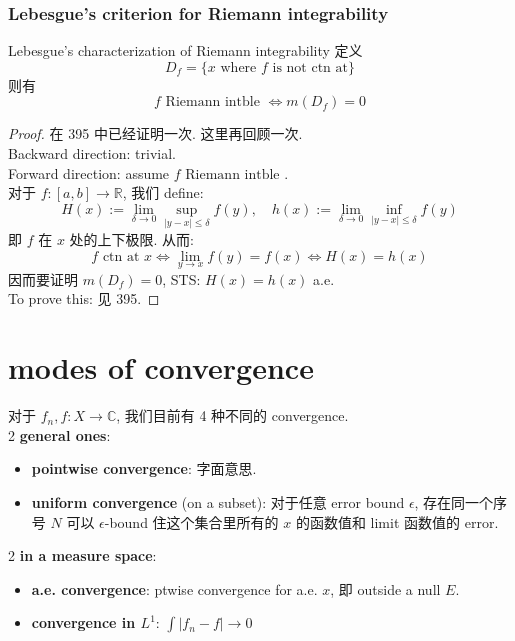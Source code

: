\documentclass[lang=cn,11pt]{elegantbook}
\begin{document}
\subsection{Lebesgue's criterion for Riemann integrability}

\begin{theorem}{Lebesgue's characterization of Riemann integrability}
     定义 \[
    D_f = \{ x \text{ where } f \text{ is not ctn at}   \}
    \]
    则有 \[
    f \text{ Riemann intble } \Longleftrightarrow m(D_f) = 0 \]
\end{theorem}
\begin{proof}
    在 395 中已经证明一次. 这里再回顾一次.\\
    Backward direction: trivial. \\
    Forward direction: assume $   f \text{ Riemann intble }$. \\
    对于 $f:[a,b] \to \mathbb{R}$,  我们 define: \[
    H(x)  := \lim_{\delta \to 0} \sup_{|y-x| \leq \delta} f(y), \quad h(x) := \lim_{\delta \to 0} \inf_{|y-x| \leq \delta} f(y)
     \]
    即 $f$ 在 $x$ 处的上下极限. 从而: \[
    f \text{ ctn at } x \Longleftrightarrow  \lim_{y \to x} f(y) = f(x)  \Longleftrightarrow H(x) = h(x)
    \]因而要证明 $m(D_f) = 0$, STS: $H(x) = h(x)$ a.e.\\
To prove this: 见 395.
\end{proof}





\chapter{modes of convergence}
对于 $f_n,f:X \rightarrow \mathbb{C}$, 我们目前有 4 种不同的 convergence.\\
2 \textbf{general ones}:
\begin{itemize}
    \item \textbf{pointwise convergence}: 字面意思. 
    \item \textbf{uniform convergence} (on a subset): 对于任意 error bound $\epsilon$, 存在同一个序号 $N$ 可以 $\epsilon$-bound 住这个集合里所有的 $x$ 的函数值和 limit 函数值的 error. 
\end{itemize}
2 \textbf{in a measure space}:
\begin{itemize}
    \item \textbf{a.e. convergence}: ptwise convergence for a.e. $x$, 即 outside a null $E$.
    \item \textbf{convergence in $L^1$}: $\int |f_n -f| \rightarrow 0$
\end{itemize}
\end{document}
